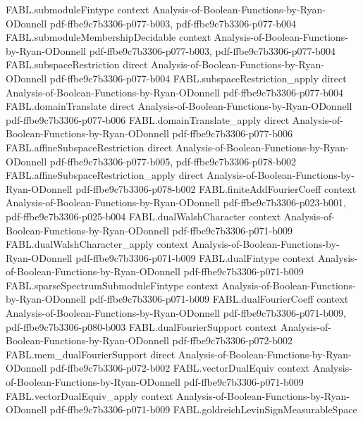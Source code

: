 \begin{theorem}
  {FABL.submoduleFintype}
  {context}
  {Analysis-of-Boolean-Functions-by-Ryan-ODonnell}
  {pdf-ffbe9c7b3306-p077-b003,
    pdf-ffbe9c7b3306-p077-b004}
\proofstep
  {FABL.submoduleMembershipDecidable}
  {context}
  {Analysis-of-Boolean-Functions-by-Ryan-ODonnell}
  {pdf-ffbe9c7b3306-p077-b003,
    pdf-ffbe9c7b3306-p077-b004}
\proofstep
  {FABL.subspaceRestriction}
  {direct}
  {Analysis-of-Boolean-Functions-by-Ryan-ODonnell}
  {pdf-ffbe9c7b3306-p077-b004}
\proofstep
  {FABL.subspaceRestriction_apply}
  {direct}
  {Analysis-of-Boolean-Functions-by-Ryan-ODonnell}
  {pdf-ffbe9c7b3306-p077-b004}
\proofstep
  {FABL.domainTranslate}
  {direct}
  {Analysis-of-Boolean-Functions-by-Ryan-ODonnell}
  {pdf-ffbe9c7b3306-p077-b006}
\proofstep
  {FABL.domainTranslate_apply}
  {direct}
  {Analysis-of-Boolean-Functions-by-Ryan-ODonnell}
  {pdf-ffbe9c7b3306-p077-b006}
\proofstep
  {FABL.affineSubspaceRestriction}
  {direct}
  {Analysis-of-Boolean-Functions-by-Ryan-ODonnell}
  {pdf-ffbe9c7b3306-p077-b005,
    pdf-ffbe9c7b3306-p078-b002}
\proofstep
  {FABL.affineSubspaceRestriction_apply}
  {direct}
  {Analysis-of-Boolean-Functions-by-Ryan-ODonnell}
  {pdf-ffbe9c7b3306-p078-b002}
\proofstep
  {FABL.finiteAddFourierCoeff}
  {context}
  {Analysis-of-Boolean-Functions-by-Ryan-ODonnell}
  {pdf-ffbe9c7b3306-p023-b001,
    pdf-ffbe9c7b3306-p025-b004}
\proofstep
  {FABL.dualWalshCharacter}
  {context}
  {Analysis-of-Boolean-Functions-by-Ryan-ODonnell}
  {pdf-ffbe9c7b3306-p071-b009}
\proofstep
  {FABL.dualWalshCharacter_apply}
  {context}
  {Analysis-of-Boolean-Functions-by-Ryan-ODonnell}
  {pdf-ffbe9c7b3306-p071-b009}
\proofstep
  {FABL.dualFintype}
  {context}
  {Analysis-of-Boolean-Functions-by-Ryan-ODonnell}
  {pdf-ffbe9c7b3306-p071-b009}
\proofstep
  {FABL.sparseSpectrumSubmoduleFintype}
  {context}
  {Analysis-of-Boolean-Functions-by-Ryan-ODonnell}
  {pdf-ffbe9c7b3306-p071-b009}
\proofstep
  {FABL.dualFourierCoeff}
  {context}
  {Analysis-of-Boolean-Functions-by-Ryan-ODonnell}
  {pdf-ffbe9c7b3306-p071-b009,
    pdf-ffbe9c7b3306-p080-b003}
\proofstep
  {FABL.dualFourierSupport}
  {context}
  {Analysis-of-Boolean-Functions-by-Ryan-ODonnell}
  {pdf-ffbe9c7b3306-p072-b002}
\proofstep
  {FABL.mem_dualFourierSupport}
  {direct}
  {Analysis-of-Boolean-Functions-by-Ryan-ODonnell}
  {pdf-ffbe9c7b3306-p072-b002}
\proofstep
  {FABL.vectorDualEquiv}
  {context}
  {Analysis-of-Boolean-Functions-by-Ryan-ODonnell}
  {pdf-ffbe9c7b3306-p071-b009}
\proofstep
  {FABL.vectorDualEquiv_apply}
  {context}
  {Analysis-of-Boolean-Functions-by-Ryan-ODonnell}
  {pdf-ffbe9c7b3306-p071-b009}
\proofstep
  {FABL.goldreichLevinSignMeasurableSpace}

\end{theorem}
